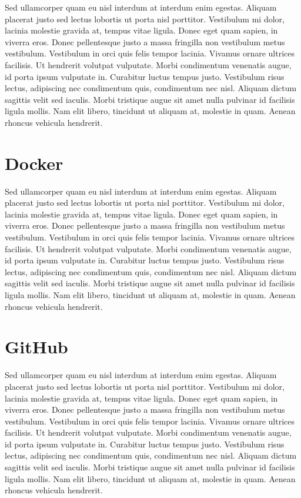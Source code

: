 Sed ullamcorper quam eu nisl interdum at interdum enim egestas. Aliquam placerat justo sed lectus lobortis ut porta nisl porttitor. Vestibulum mi dolor, lacinia molestie gravida at, tempus vitae ligula. Donec eget quam sapien, in viverra eros. Donec pellentesque justo a massa fringilla non vestibulum metus vestibulum. Vestibulum in orci quis felis tempor lacinia. Vivamus ornare ultrices facilisis. Ut hendrerit volutpat vulputate. Morbi condimentum venenatis augue, id porta ipsum vulputate in. Curabitur luctus tempus justo. Vestibulum risus lectus, adipiscing nec condimentum quis, condimentum nec nisl. Aliquam dictum sagittis velit sed iaculis. Morbi tristique augue sit amet nulla pulvinar id facilisis ligula mollis. Nam elit libero, tincidunt ut aliquam at, molestie in quam. Aenean rhoncus vehicula hendrerit.


\section{Docker}

Sed ullamcorper quam eu nisl interdum at interdum enim egestas. Aliquam placerat justo sed lectus lobortis ut porta nisl porttitor. Vestibulum mi dolor, lacinia molestie gravida at, tempus vitae ligula. Donec eget quam sapien, in viverra eros. Donec pellentesque justo a massa fringilla non vestibulum metus vestibulum. Vestibulum in orci quis felis tempor lacinia. Vivamus ornare ultrices facilisis. Ut hendrerit volutpat vulputate. Morbi condimentum venenatis augue, id porta ipsum vulputate in. Curabitur luctus tempus justo. Vestibulum risus lectus, adipiscing nec condimentum quis, condimentum nec nisl. Aliquam dictum sagittis velit sed iaculis. Morbi tristique augue sit amet nulla pulvinar id facilisis ligula mollis. Nam elit libero, tincidunt ut aliquam at, molestie in quam. Aenean rhoncus vehicula hendrerit.


\section{GitHub}

Sed ullamcorper quam eu nisl interdum at interdum enim egestas. Aliquam placerat justo sed lectus lobortis ut porta nisl porttitor. Vestibulum mi dolor, lacinia molestie gravida at, tempus vitae ligula. Donec eget quam sapien, in viverra eros. Donec pellentesque justo a massa fringilla non vestibulum metus vestibulum. Vestibulum in orci quis felis tempor lacinia. Vivamus ornare ultrices facilisis. Ut hendrerit volutpat vulputate. Morbi condimentum venenatis augue, id porta ipsum vulputate in. Curabitur luctus tempus justo. Vestibulum risus lectus, adipiscing nec condimentum quis, condimentum nec nisl. Aliquam dictum sagittis velit sed iaculis. Morbi tristique augue sit amet nulla pulvinar id facilisis ligula mollis. Nam elit libero, tincidunt ut aliquam at, molestie in quam. Aenean rhoncus vehicula hendrerit.

